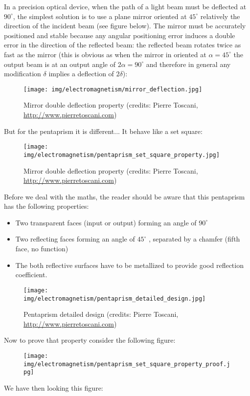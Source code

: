 	In a precision optical device, when the path of a light beam must be deflected at $90^\circ$, the simplest solution is to use a plane mirror oriented at $45^\circ$ relatively the direction of the incident beam (see figure below). The mirror must be accurately positioned and stable because any angular positioning error induces a double error in the direction of the reflected beam: the reflected beam rotates twice as fast as the mirror (this is obvious as when the mirror in oriented at $\alpha=45^\circ$ the output beam is at an output angle of $2\alpha=90^\circ$ and therefore in general any modification $\delta$ implies a deflection of $2\delta$):
	\begin{figure}[H]
		\centering
		\texttt{[image: img/electromagnetism/mirror\_deflection.jpg]}
		\caption[Mirror double deflection property]{Mirror double deflection property (credits: Pierre Toscani, \url{http://www.pierretoscani.com})}
	\end{figure}
	But for the pentaprism it is different... It behave like a set square:
	\begin{figure}[H]
		\centering
		\texttt{[image: img/electromagnetism/pentaprism\_set\_square\_property.jpg]}
		\caption[Mirror double deflection property]{Mirror double deflection property (credits: Pierre Toscani, \url{http://www.pierretoscani.com})}
	\end{figure}
	Before we deal with the maths, the reader should be aware that this pentaprism has the following properties:
	 \begin{itemize}
		\item Two transparent faces (input or output) forming an angle of $90^\circ$
		 \item Two reflecting faces forming an angle of $45^\circ$ , separated by a chamfer (fifth face, no function)
		\item The both reflective surfaces have to be metallized to provide good reflection coefficient.
	\end{itemize} 
	\begin{figure}[H]
		\centering
		\texttt{[image: img/electromagnetism/pentaprism\_detailed\_design.jpg]}
		\caption[Pentaprism detailed design]{Pentaprism detailed design (credits: Pierre Toscani, \url{http://www.pierretoscani.com})}
	\end{figure}
	Now to prove that property consider the following figure:
	\begin{figure}[H]
		\centering
		\texttt{[image: img/electromagnetism/pentaprism\_set\_square\_property\_proof.jpg]}
	\end{figure}
	We have then looking this figure:
	
